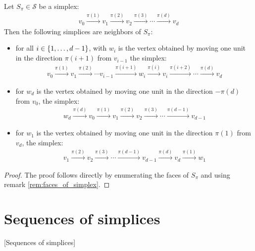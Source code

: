 \begin{lemma}
	Let $S_{\pi} \in \mathcal{S}$ be a simplex:
	\begin{align*}
		v_0 \xrightarrow{\pi(1)} v_1 \xrightarrow{\pi(2)} v_2 \xrightarrow{\pi(3)} \cdots \xrightarrow{\pi(d)} v_d
	\end{align*}
	Then the following simplices are neighbors of $S_{\pi}$:
	\begin{itemize}
		\item for all $i \in \left\{1, \dots, d-1\right\}$, with $w_i$ is the vertex obtained by moving one unit in the direction $\pi(i+1)$ from $v_{i-1}$ the simplex:
		      \begin{align*}
			      v_0 \xrightarrow{\pi(1)} v_1 \xrightarrow{\pi(2)} \cdots v_{i-1} \xrightarrow{\pi(i+1)} w_i \xrightarrow{\pi(i)} v_{i} \xrightarrow{\pi(i+2)} \cdots \xrightarrow{\pi(d)} v_d
		      \end{align*}
		\item for $w_d$ is the vertex obtained by moving one unit in the direction $-\pi(d)$ from $v_{0}$, the simplex:
		      \begin{align*}
			      w_d \xrightarrow{\pi(d)} v_0 \xrightarrow{\pi(1)} v_1 \xrightarrow{\pi(2)} v_2 \xrightarrow{\pi(3)} \cdots \xrightarrow{\pi(d-1)} v_{d-1}
		      \end{align*}
		\item for $w_1$ is the vertex obtained by moving one unit in the direction $\pi(1)$ from $v_{d}$, the simplex:
		      \begin{align*}
			      v_1 \xrightarrow{\pi(2)} v_2 \xrightarrow{\pi(3)} \cdots \xrightarrow{\pi(d-1)} v_{d-1} \xrightarrow{\pi(d)} v_d \xrightarrow{\pi(1)} w_1
		      \end{align*}
	\end{itemize}
\end{lemma}
\begin{proof}
	The proof follows directly by enumerating the faces of $S_{\pi}$ and using remark \cref{rem:faces_of_simplex}.
\end{proof}

\section{Sequences of simplices}[Sequences of simplices]

